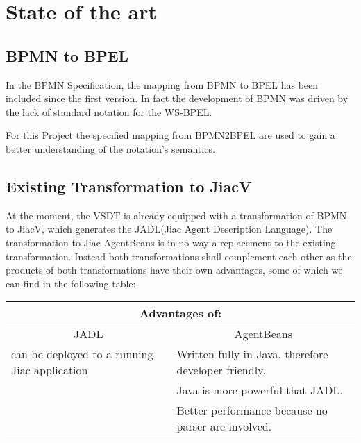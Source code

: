 \chapter{State of the art}

\section{BPMN to BPEL}
In the BPMN Specification, the mapping from BPMN to BPEL has been included since the first version. In fact the development of BPMN was driven by the lack of standard notation for the WS-BPEL\cite{weidlich2008}. 


For this Project the specified mapping from BPMN2BPEL are used to gain a better understanding of the notation's semantics.


\section{Existing Transformation to JiacV}
At the moment, the VSDT is already equipped with a transformation of BPMN to JiacV, which generates the JADL(Jiac Agent Description Language).
The transformation to Jiac AgentBeans is in no way a replacement to the existing transformation. Instead both transformations shall complement each other as the products of both transformations have their own advantages, some of which we can find in the following table:
\begin{table}[htbp]
	\centering
		\begin{tabularx}{\linewidth}{|l|X|}\hline\hline
			\multicolumn{2}{|c|}{\textbf{Advantages of:}} \\\hline
			\multicolumn{1}{|c|}{JADL} & \multicolumn{1}{c|}{AgentBeans}\\\hline
			can be deployed to a running Jiac application &  Written fully in Java, therefore developer friendly.\\
																										&  Java is more powerful that JADL.\\
			                           										&  Better performance because no parser are involved.\\\hline\hline
		\end{tabularx}
\end{table}

